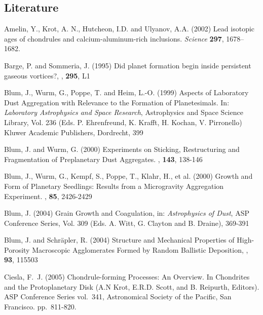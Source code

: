 \subsection{Literature}
%
%
%
\begin{literature}

\item Amelin, Y., Krot, A. N., Hutcheon, I.D. and Ulyanov, A.A. (2002) 
Lead isotopic ages of chondrules and calcium-aluminum-rich inclusions.
\textit{Science} \textbf{297}, 1678--1682.

\item Barge, P. and Sommeria, J. (1995) Did planet formation begin
inside persistent gaseous vortices?, \aap, \textbf{295}, L1

\item Blum, J., Wurm, G., Poppe, T. and Heim, L.-O. (1999) Aspects
of Laboratory Dust Aggregation with Relevance to the Formation of
Planetesimals. In: \textit{Laboratory Astrophysics and Space
Research}, Astrophysics and Space Science Library, Vol. 236 (Eds.
P. Ehrenfreund, K. Krafft, H. Kochan, V. Pirronello) Kluwer
Academic Publishers, Dordrecht, 399

\item Blum, J. and Wurm, G. (2000) Experiments on Sticking,
Restructuring and Fragmentation of Preplanetary Dust Aggregates.
\ica, \textbf{143}, 138-146

\item Blum, J., Wurm, G., Kempf, S., Poppe, T., Klahr, H., et al.
(2000) Growth and Form of Planetary Seedlings: Results from a
Microgravity Aggregation Experiment. \prl, \textbf{85}, 2426-2429

\item Blum, J. (2004) Grain Growth and Coagulation, in:
\textit{Astrophysics of Dust}, ASP Conference Series, Vol. 309
(Eds. A. Witt, G. Clayton and B. Draine), 369-391

\item Blum, J. and Schr\"apler, R. (2004) Structure and Mechanical
Properties of High-Porosity Macroscopic Agglomerates Formed by
Random Ballistic Deposition, \prl, \textbf{93}, 115503

\item Ciesla, F.~J. (2005) Chondrule-forming Processes: An
Overview. In Chondrites and the Protoplanetary Disk (A.N Krot, E.R.D.
Scott, and B. Reipurth, Editors). ASP Conference Series vol.\ 341,
Astronomical Society of the Pacific, San Francisco. pp.\
811-820.


\end{literature}

